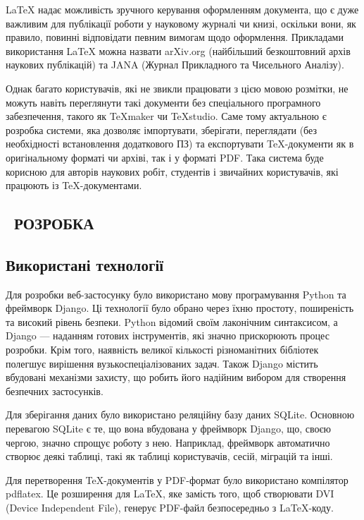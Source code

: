 \documentclass[a4paper,14pt]{extarticle}
\numberwithin{figure}{section}
\begin{document}
    LaTeX надає можливість зручного керування оформленням документа, що є дуже важливим для публікації роботи у науковому журналі чи книзі, оскільки вони, як правило, повинні відповідати певним вимогам щодо оформлення. Прикладами використання LaTeX можна назвати arXiv.org (найбільший безкоштовний архів наукових публікацій) та JANA (Журнал Прикладного та Чисельного Аналізу). 

    Однак багато користувачів, які не звикли працювати з цією мовою розмітки, не можуть навіть переглянути такі документи без спеціального програмного забезпечення, такого як TeXmaker чи TeXstudio. Саме тому актуальною є розробка системи, яка дозволяє імпортувати, зберігати, переглядати (без необхідності встановлення додаткового ПЗ) та експортувати TeX-документи як в оригінальному форматі чи архіві, так і у форматі PDF. Така система буде корисною для авторів наукових робіт, студентів і звичайних користувачів, які працюють із TeX-документами.
    
    \newpage
    
    \begin{center}
        \section{\large \ РОЗРОБКА} 
    \end{center}
    \subsection{\large Використані технології}
    
    Для розробки веб-застосунку було використано мову програмування Python та фреймворк Django. Ці технології було обрано через їхню простоту, поширеність та високий рівень безпеки. Python відомий своїм лаконічним синтаксисом, а Django --- наданням готових інструментів, які значно прискорюють процес розробки. Крім того, наявність великої кількості різноманітних бібліотек полегшує вирішення вузькоспеціалізованих задач. Також Django містить вбудовані механізми захисту, що робить його надійним вибором для створення безпечних застосунків.

    Для зберігання даних було використано реляційну базу даних SQLite. Основною перевагою SQLite є те, що вона вбудована у фреймворк Django, що, своєю чергою, значно спрощує роботу з нею. Наприклад, фреймворк автоматично створює деякі таблиці, такі як таблиці користувачів, сесій, міграцій та інші.

    Для перетворення TeX-документів у PDF-формат було використано компілятор pdflatex. Це розширення для LaTeX, яке замість того, щоб створювати DVI (Device Independent File), генерує PDF-файл безпосередньо з LaTeX-коду.
\end{document}

